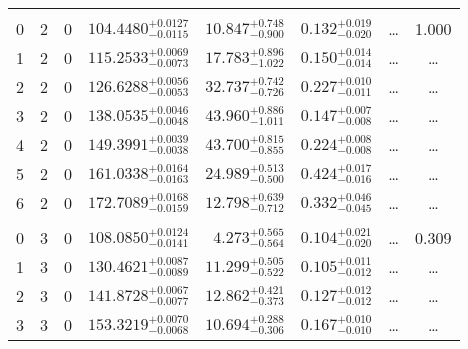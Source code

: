 \begin{table*}[!]
\begin{tabular}{llcrrlrc}
\hline \\[-8pt]
0 & 2 & 0 & $    104.4480_{-      0.0115}^{+      0.0127}$ & $      10.847_{-       0.900}^{+       0.748}$ & $       0.132_{-       0.020}^{+       0.019}$ & \multicolumn{1}{c}{\dots} & 1.000\\[1pt]
1 & 2 & 0 & $    115.2533_{-      0.0073}^{+      0.0069}$ & $      17.783_{-       1.022}^{+       0.896}$ & $       0.150_{-       0.014}^{+       0.014}$ & \multicolumn{1}{c}{\dots} & \dots \\[1pt]
2 & 2 & 0 & $    126.6288_{-      0.0053}^{+      0.0056}$ & $      32.737_{-       0.726}^{+       0.742}$ & $       0.227_{-       0.011}^{+       0.010}$ & \multicolumn{1}{c}{\dots} & \dots \\[1pt]
3 & 2 & 0 & $    138.0535_{-      0.0048}^{+      0.0046}$ & $      43.960_{-       1.011}^{+       0.886}$ & $       0.147_{-       0.008}^{+       0.007}$ & \multicolumn{1}{c}{\dots} & \dots \\[1pt]
4 & 2 & 0 & $    149.3991_{-      0.0038}^{+      0.0039}$ & $      43.700_{-       0.855}^{+       0.815}$ & $       0.224_{-       0.008}^{+       0.008}$ & \multicolumn{1}{c}{\dots} & \dots \\[1pt]
5 & 2 & 0 & $    161.0338_{-      0.0163}^{+      0.0164}$ & $      24.989_{-       0.500}^{+       0.513}$ & $       0.424_{-       0.016}^{+       0.017}$ & \multicolumn{1}{c}{\dots} & \dots \\[1pt]
6 & 2 & 0 & $    172.7089_{-      0.0159}^{+      0.0168}$ & $      12.798_{-       0.712}^{+       0.639}$ & $       0.332_{-       0.045}^{+       0.046}$ & \multicolumn{1}{c}{\dots} & \dots \\[1pt]
\hline \\[-8pt]
0 & 3 & 0 & $    108.0850_{-      0.0141}^{+      0.0124}$ & $       4.273_{-       0.564}^{+       0.565}$ & $       0.104_{-       0.020}^{+       0.021}$ & \multicolumn{1}{c}{\dots} & 0.309\\[1pt]
1 & 3 & 0 & $    130.4621_{-      0.0089}^{+      0.0087}$ & $      11.299_{-       0.522}^{+       0.505}$ & $       0.105_{-       0.012}^{+       0.011}$ & \multicolumn{1}{c}{\dots} & \dots \\[1pt]
2 & 3 & 0 & $    141.8728_{-      0.0077}^{+      0.0067}$ & $      12.862_{-       0.373}^{+       0.421}$ & $       0.127_{-       0.012}^{+       0.012}$ & \multicolumn{1}{c}{\dots} & \dots \\[1pt]
3 & 3 & 0 & $    153.3219_{-      0.0068}^{+      0.0070}$ & $      10.694_{-       0.306}^{+       0.288}$ & $       0.167_{-       0.010}^{+       0.010}$ & \multicolumn{1}{c}{\dots} & \dots \\[1pt]

\end{tabular}
\end{table*}
